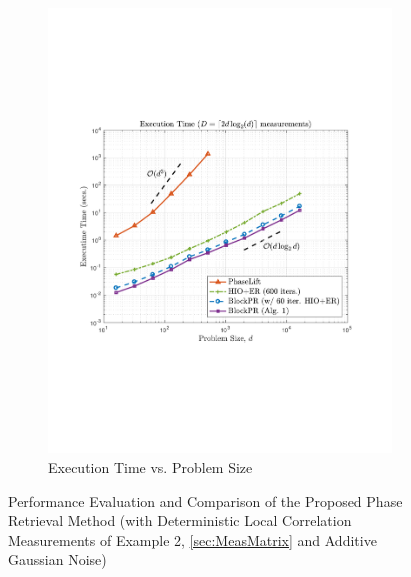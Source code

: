 \begin{figure}[hbtp]
\begin{subfigure}[b]{0.8\textwidth}
\centering
\includegraphics[clip=true, trim = 0.5in 2.5in 0.75in 2.5in,scale=0.55]{pics/fig5b}
\caption{Execution Time vs. Problem Size}
\label{fig:exectime}
\end{subfigure}
\caption{Performance Evaluation and Comparison of the Proposed Phase Retrieval Method 
(with Deterministic Local Correlation Measurements of Example 2, \cref{sec:MeasMatrix} and Additive Gaussian Noise)}
\label{fig:performance}
\end{figure}
%

